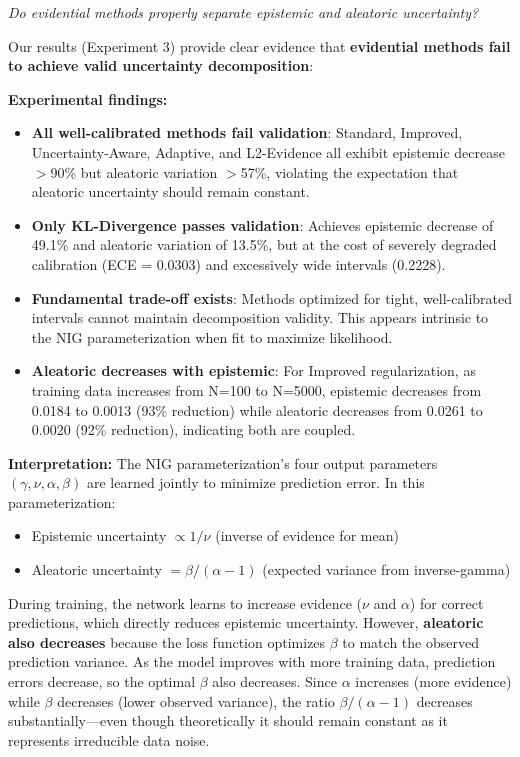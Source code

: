 \textit{Do evidential methods properly separate epistemic and aleatoric uncertainty?}

Our results (Experiment 3) provide clear evidence that \textbf{evidential methods fail to achieve valid uncertainty decomposition}:

\textbf{Experimental findings:}
\begin{itemize}
\item \textbf{All well-calibrated methods fail validation}: Standard, Improved, Uncertainty-Aware, Adaptive, and L2-Evidence all exhibit epistemic decrease $>$90\% but aleatoric variation $>$57\%, violating the expectation that aleatoric uncertainty should remain constant.

\item \textbf{Only KL-Divergence passes validation}: Achieves epistemic decrease of 49.1\% and aleatoric variation of 13.5\%, but at the cost of severely degraded calibration (ECE = 0.0303) and excessively wide intervals (0.2228).

\item \textbf{Fundamental trade-off exists}: Methods optimized for tight, well-calibrated intervals cannot maintain decomposition validity. This appears intrinsic to the NIG parameterization when fit to maximize likelihood.

\item \textbf{Aleatoric decreases with epistemic}: For Improved regularization, as training data increases from N=100 to N=5000, epistemic decreases from 0.0184 to 0.0013 (93\% reduction) while aleatoric decreases from 0.0261 to 0.0020 (92\% reduction), indicating both are coupled.
\end{itemize}

\textbf{Interpretation:}
The NIG parameterization's four output parameters $(\gamma, \nu, \alpha, \beta)$ are learned jointly to minimize prediction error. In this parameterization:
\begin{itemize}
\item Epistemic uncertainty $\propto 1/\nu$ (inverse of evidence for mean)
\item Aleatoric uncertainty $= \beta/(\alpha - 1)$ (expected variance from inverse-gamma)
\end{itemize}

During training, the network learns to increase evidence ($\nu$ and $\alpha$) for correct predictions, which directly reduces epistemic uncertainty. However, \textbf{aleatoric also decreases} because the loss function optimizes $\beta$ to match the observed prediction variance. As the model improves with more training data, prediction errors decrease, so the optimal $\beta$ also decreases. Since $\alpha$ increases (more evidence) while $\beta$ decreases (lower observed variance), the ratio $\beta/(\alpha-1)$ decreases substantially—even though theoretically it should remain constant as it represents irreducible data noise.


